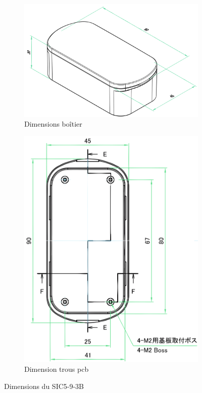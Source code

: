 \begin{figure}[h!]
	\centering
	\begin{subfigure}[b]{0.6\textwidth}
		\centering
		\includegraphics[width=\textwidth]{../figures/dev-pcb/boitier-dim}
		\caption{Dimensions boîtier}
		\label{fig:boitier-dim}
	\end{subfigure}
	\hfill
	\begin{subfigure}[b]{0.35\textwidth}
		\centering
		\includegraphics[width=\textwidth]{../figures/dev-pcb/boitier-dims-pcb}
		\caption{Dimension trous \gls{pcb}}
		\label{fig:boitier-dims-pcb}
	\end{subfigure}
	\caption{Dimensions du SIC5-9-3B}
	\label{fig:boitier-dimensions}
\end{figure}

